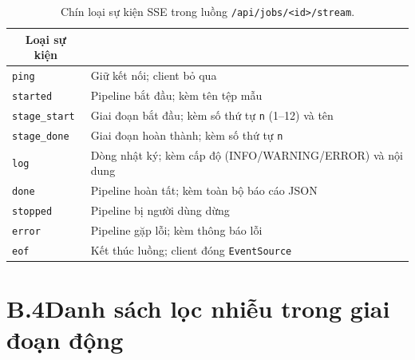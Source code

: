 \documentclass[../DoAn.tex]{subfiles}
\begin{document}
\begin{table}[H]
\centering
\caption{Chín loại sự kiện SSE trong luồng \texttt{/api/jobs/<id>/stream}.}
\label{tab:sse-events}
\begin{tabular}{|l|>{\raggedright\arraybackslash}p{9.5cm}|}
\hline
\multicolumn{1}{|c|}{\textbf{Loại sự kiện}} & \multicolumn{1}{c|}{\textbf{Nội dung}} \\
\hline
\texttt{ping}         & Giữ kết nối; client bỏ qua \\
\hline
\texttt{started}      & Pipeline bắt đầu; kèm tên tệp mẫu \\
\hline
\texttt{stage\_start} & Giai đoạn bắt đầu; kèm số thứ tự \texttt{n} (1–12) và tên \\
\hline
\texttt{stage\_done}  & Giai đoạn hoàn thành; kèm số thứ tự \texttt{n} \\
\hline
\texttt{log}          & Dòng nhật ký; kèm cấp độ (INFO/WARNING/ERROR) và nội dung \\
\hline
\texttt{done}         & Pipeline hoàn tất; kèm toàn bộ báo cáo JSON \\
\hline
\texttt{stopped}      & Pipeline bị người dùng dừng \\
\hline
\texttt{error}        & Pipeline gặp lỗi; kèm thông báo lỗi \\
\hline
\texttt{eof}          & Kết thúc luồng; client đóng \texttt{EventSource} \\
\hline
\end{tabular}
\end{table}
\section*{B.4\quad Danh sách lọc nhiễu trong giai đoạn động}
\end{document}
